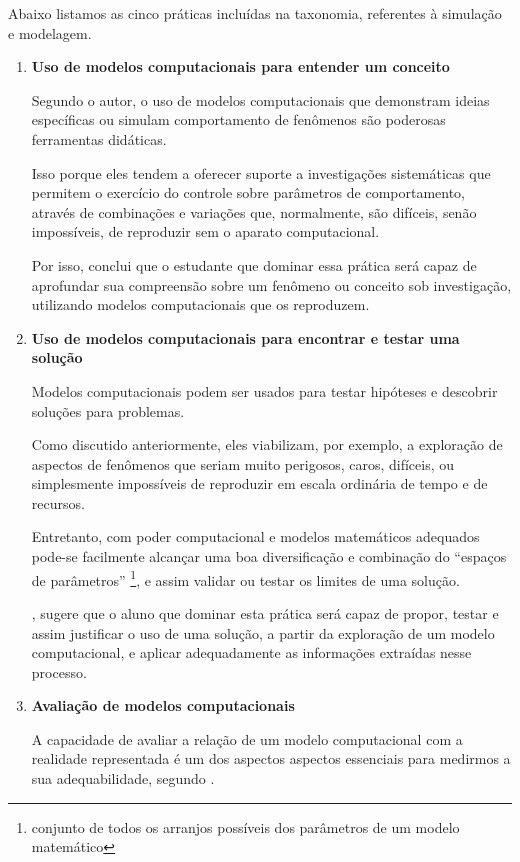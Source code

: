 Abaixo listamos as cinco práticas incluídas na taxonomia, referentes à simulação e modelagem.

\begin{enumerate}
  \item \textbf{Uso de modelos computacionais para entender um conceito}

  Segundo o autor, o uso de modelos computacionais que demonstram ideias específicas ou simulam comportamento de fenômenos são poderosas ferramentas didáticas.

  Isso porque eles tendem a oferecer suporte a investigações sistemáticas que permitem o exercício do controle sobre parâmetros de comportamento, através de combinações e variações que, normalmente, são difíceis, senão impossíveis, de reproduzir sem o aparato computacional.

  Por isso, conclui que o estudante que dominar essa prática será capaz de aprofundar sua compreensão sobre um fenômeno ou conceito sob investigação, utilizando modelos computacionais que os reproduzem.

  \item \textbf{Uso de modelos computacionais para encontrar e testar uma solução}
  
  Modelos computacionais podem ser usados para testar hipóteses e descobrir soluções para problemas. 

  Como discutido anteriormente, eles viabilizam, por exemplo, a exploração de aspectos de fenômenos que seriam muito perigosos, caros, difíceis, ou simplesmente impossíveis de reproduzir em escala ordinária de tempo e de recursos.

  Entretanto, com poder computacional e modelos matemáticos adequados pode-se facilmente alcançar uma boa diversificação e combinação do ``espaços de parâmetros'' \footnote{conjunto de todos os arranjos possíveis dos parâmetros de um modelo matemático}, e assim validar ou testar os limites de uma solução.

  , sugere que o aluno que dominar esta prática será capaz de propor, testar e assim justificar o uso de uma solução, a partir da exploração de um modelo computacional, e aplicar adequadamente as informações extraídas nesse processo.

  \item \textbf{Avaliação de modelos computacionais}

  A capacidade de avaliar a relação de um modelo computacional com a realidade representada é um dos aspectos aspectos essenciais para medirmos a sua adequabilidade, segundo .


\end{enumerate}

